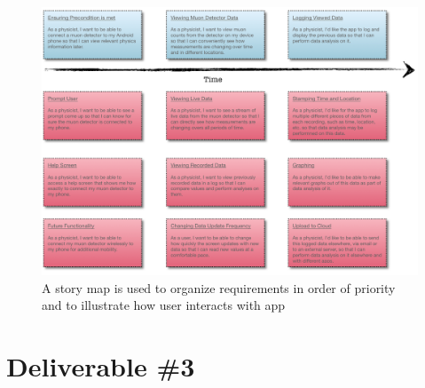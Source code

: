 \documentclass[11pt,a4paper]{article}
\begin{document}
\newpage
\begin{landscape}
\begin{figure}[h]
  \centering
  \vspace*{-2cm} \hspace*{-0.5cm}
      \includegraphics[width=1.9\textwidth]{storymap.png}
      \caption{A story map is used to organize requirements in order of priority and to illustrate how user interacts with app}
  
\end{figure}
\end{landscape}

\section*{Deliverable \#3}
\end{document}

